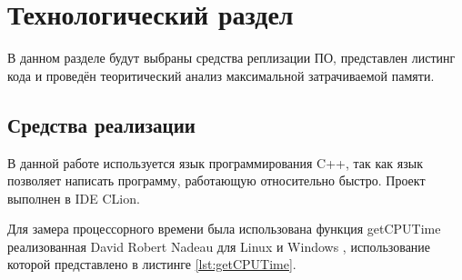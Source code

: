 \chapter{Технологический раздел}
\label{cha:technological}

    В данном разделе будут выбраны средства реплизации ПО, представлен листинг кода
    и проведён теоритический анализ максимальной затрачиваемой памяти. 

    \section{Средства реализации}
        В данной работе используется язык программирования C++, так как
        язык позволяет написать программу, работающую относительно быстро. 
        Проект выполнен в IDE CLion.

        Для замера процессорного времени была использована функция getCPUTime
реализованная David Robert Nadeau для Linux и Windows , использование которой представлено в листинге \ref{lst:getCPUTime}.

